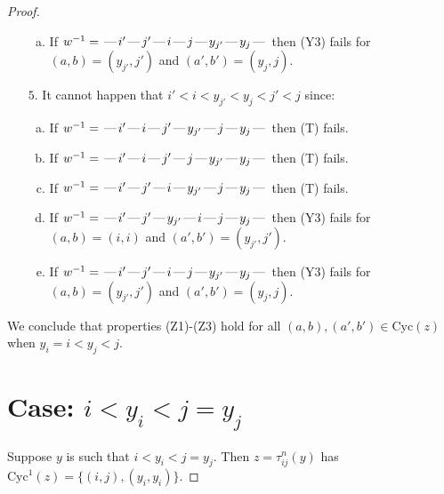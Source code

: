 \documentclass[10pt]{article}
\theoremstyle{definition}
\theoremstyle{definition}
\def\dash{\text{\hspace{0.5mm}---\hspace{0.5mm}}}
\def\Cyc{\mathrm{Cyc}}
\begin{document}
\begin{proof}
\begin{enumerate}
\begin{enumerate}[(a)]
\item If $w^{-1} = \dash i'\dash j'\dash i\dash j\dash y_{j'}\dash y_j\dash $ then (Y3) fails for $(a,b)=(y_{j'},j')$ and $(a',b')=(y_j,j)$.
\end{enumerate}
\item[$5$.] It cannot happen that $i' < i < y_{j'} < y_j < j' < j$ since:
\begin{enumerate}[(a)]
\item If $w^{-1} = \dash i'\dash i\dash j'\dash y_{j'}\dash j\dash y_j\dash $ then (T) fails.
\item If $w^{-1} = \dash i'\dash i\dash j'\dash j\dash y_{j'}\dash y_j\dash $ then (T) fails.
\item If $w^{-1} = \dash i'\dash j'\dash i\dash y_{j'}\dash j\dash y_j\dash $ then (T) fails.
\item If $w^{-1} = \dash i'\dash j'\dash y_{j'}\dash i\dash j\dash y_j\dash $ then (Y3) fails for $(a,b)=(i,i)$ and $(a',b')=(y_{j'},j')$.
\item If $w^{-1} = \dash i'\dash j'\dash i\dash j\dash y_{j'}\dash y_j\dash $ then (Y3) fails for $(a,b)=(y_{j'},j')$ and $(a',b')=(y_j,j)$.
\end{enumerate}
\end{enumerate}
We conclude that properties (Z1)-(Z3) hold for all 
$(a,b),(a',b') \in \Cyc(z)$ when $y_i = i < y_j < j$.
\section{Case: $i < y_i < j = y_j$}
Suppose $y$ is such that $i < y_i < j = y_j$.
Then $z = \tau^n_{ij}(y)$ has $\Cyc^1(z) = \{(i,j),(y_i,y_i)\}.$

\end{proof}
\end{document}
